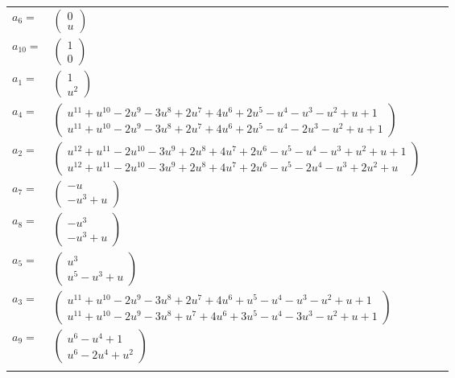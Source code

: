 \documentclass[1p]{elsarticle_modified}
\theoremstyle{definition}
\begin{document}
\begin{tabular}{m{7pt} m{180pt} m{7pt} m{180pt} }
\flushright $a_{6}=$&$\begin{pmatrix}0\\u\end{pmatrix}$ \\
\flushright $a_{10}=$&$\begin{pmatrix}1\\0\end{pmatrix}$ \\
\flushright $a_{1}=$&$\begin{pmatrix}1\\u^2\end{pmatrix}$ \\
\flushright $a_{4}=$&$\begin{pmatrix}u^{11}+u^{10}-2 u^9-3 u^8+2 u^7+4 u^6+2 u^5- u^4- u^3- u^2+u+1\\u^{11}+u^{10}-2 u^9-3 u^8+2 u^7+4 u^6+2 u^5- u^4-2 u^3- u^2+u+1\end{pmatrix}$ \\
\flushright $a_{2}=$&$\begin{pmatrix}u^{12}+u^{11}-2 u^{10}-3 u^9+2 u^8+4 u^7+2 u^6- u^5- u^4- u^3+u^2+u+1\\u^{12}+u^{11}-2 u^{10}-3 u^9+2 u^8+4 u^7+2 u^6- u^5-2 u^4- u^3+2 u^2+u\end{pmatrix}$ \\
\flushright $a_{7}=$&$\begin{pmatrix}- u\\- u^3+u\end{pmatrix}$ \\
\flushright $a_{8}=$&$\begin{pmatrix}- u^3\\- u^3+u\end{pmatrix}$ \\
\flushright $a_{5}=$&$\begin{pmatrix}u^3\\u^5- u^3+u\end{pmatrix}$ \\
\flushright $a_{3}=$&$\begin{pmatrix}u^{11}+u^{10}-2 u^9-3 u^8+2 u^7+4 u^6+u^5- u^4- u^3- u^2+u+1\\u^{11}+u^{10}-2 u^9-3 u^8+u^7+4 u^6+3 u^5- u^4-3 u^3- u^2+u+1\end{pmatrix}$ \\
\flushright $a_{9}=$&$\begin{pmatrix}u^6- u^4+1\\u^6-2 u^4+u^2\end{pmatrix}$\\&\end{tabular}
\end{document}
